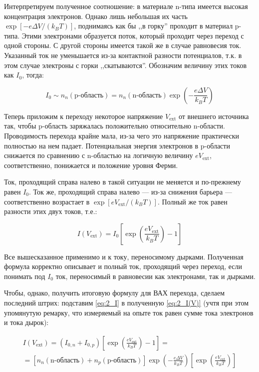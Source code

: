 \documentclass[a4paper, 12pt]{article}
\begin{document}
Интерпретируем полученное соотношение: в материале n-типа имеется высокая концентрация электронов. Однако лишь небольшая их часть $\exp\left[-e\Delta V / (k_B T)\right]$, поднимаясь как бы ,,в горку'' проходит в материал p-типа. Этими электронами образуется поток, который проходит через переход с одной стороны. С другой стороны имеется такой же в случае равновесия ток. Указанный ток не уменьшается из-за контактной разности потенциалов, т.к. в этом случае электроны с горки ,,скатываются''. Обозначим величину этих токов как $I_0$, тогда:

\begin{equation}
	I_0 \sim n_n(\text{p-область}) = n_n(\text{n-область})\exp\left(-\frac{e\Delta V}{k_B T}\right)
	\label{eq:2_I}
\end{equation}

Теперь приложим к переходу некоторое напряжение $V_\text{ext}$ от внешнего источника так, чтобы p-область заряжалась положительно относительно n-области. Проводимость перехода крайне мала, из-за чего это напряжение практически полностью на нем падает. Потенциальная энергия электронов в p-области снижается по сравнению с n-областью на логичную величину $eV_{\text{ext}}$, соответственно, понижается и положение уровня Ферми.

Ток, проходящий справа налево в такой ситуации не меняется и по-прежнему равен $I_0$. Ток же, проходящий справа налево --- из-за снижения барьера --- соответственно возрастает в $\exp[eV_{\text{ext}} / (k_B T)]$. Полный же ток равен разности этих двух токов, т.е.:

\begin{equation}
	I(V_\text{ext}) = I_0 \left[\exp\left(\frac{e V_{\text{ext}}}{k_B T}\right) - 1\right]
	\label{eq:2_I(V)}
\end{equation}

Все вышесказанное применимо и к току, переносимому дырками. Полученная формула корректно описывает и полный ток, проходящий через переход, если понимать под $I_0$ ток, переносимый в равновесии как электронами, так и дырками.

Чтобы, однако, получить итоговую формулу для ВАХ перехода, сделаем последний штрих: подставим \ref{eq:2_I} в полученную \ref{eq:2_I(V)} (учтя при этом упомянутую ремарку, что измеряемый на опыте ток равен сумме тока электронов и тока дырок):

\begin{align*}
	I(V_{\text{ext}}) = (I_{0, n} + I_{0, p}) \left[\exp\left(\frac{e V_{\text{ext}}}{k_B T}\right) - 1\right] = \\ = [n_n(\text{n-область}) + n_p(\text{p-область})]\exp\left(-\frac{e \Delta V}{k_B T}\right) \left[\exp\left(\frac{e V_{\text{ext}}}{k_B T}\right)\right]
\end{align*}
\end{document}
